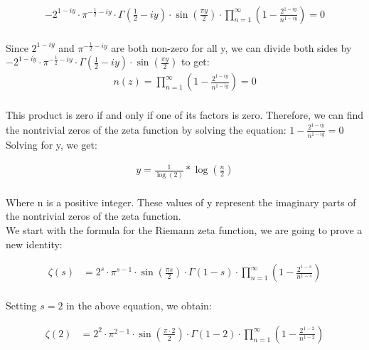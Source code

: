\documentclass{article}
\begin{document}
 \\

\begin{align*}
-2^{1-iy}\cdot \pi^{-\frac{1}{2}-iy}\cdot \Gamma\left(\frac{1}{2}-iy\right) \cdot \sin\left(\frac{\pi y}{2}\right) \cdot \prod_{n=1}^{\infty}\left(1-\frac{2^{1-iy}}{n^{1-iy}}\right) = 0\\
\end{align*}

Since $2^{1-iy}$ and $\pi^{-\frac{1}{2}-iy}$ are both non-zero for all y, we can divide both sides by  $-2^{1-iy}\cdot \pi^{-\frac{1}{2}-iy}\cdot \Gamma\left(\frac{1}{2}-iy\right) \cdot \sin\left(\frac{\pi y}{2}\right)$ to get: \\

\begin{align*}
n(z)=\prod_{n=1}^{\infty}\left(1-\frac{2^{1-iy}}{n^{1-iy}}\right) = 0 \\
\end{align*}

This product is zero if and only if one of its factors is zero. Therefore, we can find the nontrivial zeros of the zeta function by solving the equation: $1-\frac{2^{1-iy}}{n^{1-iy}} = 0$ Solving for y, we get:

\begin{align*}
y = \frac{1}{\log(2)} * \log\left(\frac{n}{2}\right) \\
\end{align*}

Where n is a positive integer. These values of y represent the imaginary parts of the nontrivial zeros of the zeta function. \\

We start with the formula for the Riemann zeta function, we are going to prove a new identity:

\begin{align*}
\zeta(s) &= 2^{s}\cdot\pi^{s-1}\cdot\sin(\frac{\pi s}{2})\cdot\Gamma(1-s)\cdot\prod_{n=1}^{\infty}(1-\frac{2^{1-s}}{n^{1-s}}) \\
\end{align*}

Setting $s=2$ in the above equation, we obtain:

\begin{align*}
\zeta(2) &= 2^{2}\cdot\pi^{2-1}\cdot\sin(\frac{\pi\cdot2}{2})\cdot\Gamma(1-2)\cdot\prod_{n=1}^{\infty}(1-\frac{2^{1-2}}{n^{1-2}}) \\
\end{align*}
\end{document}
